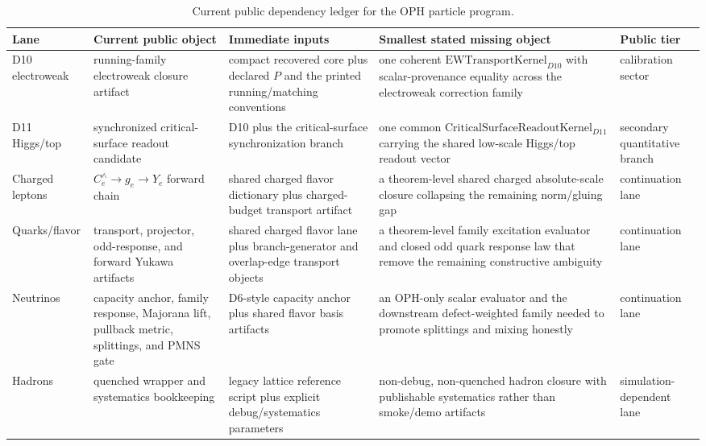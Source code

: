 \documentclass[11pt]{article}
\begin{document}
\begingroup
\small
\setlength{\tabcolsep}{3pt}
\begin{longtable}{@{}>{\raggedright\arraybackslash}p{}>{\raggedright\arraybackslash}p{}>{\raggedright\arraybackslash}p{}>{\raggedright\arraybackslash}p{}>{\raggedright\arraybackslash}p{}@{}}
\caption{Current public dependency ledger for the OPH particle program.}\\
\toprule
Lane & Current public object & Immediate inputs & Smallest stated missing object & Public tier \\
\midrule
\endhead
\bottomrule
\endfoot
D10 electroweak & running-family electroweak closure artifact & compact recovered core plus declared \(P\) and the printed running/matching conventions & one coherent \(\mathrm{EWTransportKernel}_{D10}\) with scalar-provenance equality across the electroweak correction family & calibration sector \\
D11 Higgs/top & synchronized critical-surface readout candidate & D10 plus the critical-surface synchronization branch & one common \(\mathrm{CriticalSurfaceReadoutKernel}_{D11}\) carrying the shared low-scale Higgs/top readout vector & secondary quantitative branch \\
Charged leptons & \(C_e^{\wedge} \to g_e \to Y_e\) forward chain & shared charged flavor dictionary plus charged-budget transport artifact & a theorem-level shared charged absolute-scale closure collapsing the remaining norm/gluing gap & continuation lane \\
Quarks/flavor & transport, projector, odd-response, and forward Yukawa artifacts & shared charged flavor lane plus branch-generator and overlap-edge transport objects & a theorem-level family excitation evaluator and closed odd quark response law that remove the remaining constructive ambiguity & continuation lane \\
Neutrinos & capacity anchor, family response, Majorana lift, pullback metric, splittings, and PMNS gate & D6-style capacity anchor plus shared flavor basis artifacts & an OPH-only scalar evaluator and the downstream defect-weighted family needed to promote splittings and mixing honestly & continuation lane \\
Hadrons & quenched wrapper and systematics bookkeeping & legacy lattice reference script plus explicit debug/systematics parameters & non-debug, non-quenched hadron closure with publishable systematics rather than smoke/demo artifacts & simulation-dependent lane \\
\end{longtable}
\endgroup
\end{document}
